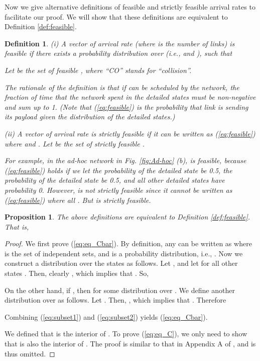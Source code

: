 \documentclass{IEEEtran}
\newtheorem{definitn}{Definition}
\newtheorem{prop}{Proposition}
\begin{document}
Now we give alternative definitions of feasible and strictly feasible
arrival rates to facilitate our proof. We will show that these definitions
are equivalent to Definition \ref{def:feasible}.
\begin{definitn}
\label{def:C-Cbar-CO}(i) A vector of arrival rate 
(where  is the number of links) is \emph{feasible} if there exists
a probability distribution  over  (i.e.,
 and ),
such that 


Let  be the set of feasible ,
where {}``CO'' stands for {}``collision''.

The rationale of the definition is that if  can be
scheduled by the network, the fraction of time that the network spent
in the detailed states must be non-negative and sum up to 1. (Note
that (\ref{eq:feasible}) is the probability that link  is sending
its payload given the distribution of the detailed states.)

(ii) A vector of arrival rate 
is \emph{strictly feasible} if it can be written as (\ref{eq:feasible})
where  and .
Let  be the set of strictly feasible . 

For example, in the ad-hoc network in Fig. \ref{fig:Ad-hoc} (b),
 is feasible, because (\ref{eq:feasible})
holds if we let the probability of the detailed state 
be 0.5, the probability of the detailed state 
be 0.5, and all other detailed states have probability 0. However,
 is not strictly feasible since it cannot
be written as (\ref{eq:feasible}) where all .
But  is strictly feasible.\medskip{}
\end{definitn}
\begin{prop}
The above definitions are equivalent to Definition \ref{def:feasible}.
That is,
\end{prop}
\begin{proof}
We first prove (\ref{eq:eq_Cbar}). By definition, any 
can be written as 
where  is the set of independent sets, and 
is a probability distribution, i.e., .
Now we construct a distribution  over the states 
as follows. Let ,
and let  for all other states . Then,
clearly ,
which implies that . So, 


On the other hand, if , then
 for some distribution
 over . We define another distribution 
over  as follows. Let .
Then, ,
which implies that . Therefore


Combining (\ref{eq:subset1}) and (\ref{eq:subset2}) yields (\ref{eq:eq_Cbar}).

We defined that  is the interior of .
To prove (\ref{eq:eq_C}), we only need to show that 
is also the interior of . The proof is similar to
that in Appendix A of \cite{CSMA_longer}, and is thus omitted.
\end{proof}
\end{document}
